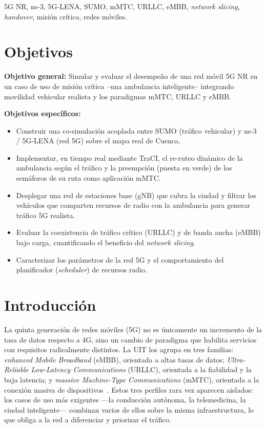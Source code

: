 \documentclass[conference,onecolumn]{IEEEtran}
\begin{document}
\begin{IEEEkeywords}
5G NR, ns-3, 5G-LENA, SUMO, mMTC, URLLC, eMBB, \textit{network slicing},
\textit{handover}, misión crítica, redes móviles.
\end{IEEEkeywords}

\IEEEpeerreviewmaketitle

\section*{Objetivos}
\textbf{Objetivo general:} Simular y evaluar el desempeño de una red móvil 5G NR
en un caso de uso de misión crítica --una ambulancia inteligente-- integrando
movilidad vehicular realista y los paradigmas mMTC, URLLC y eMBB.

\noindent\textbf{Objetivos específicos:}
\begin{itemize}
\item Construir una co-simulación acoplada entre SUMO (tráfico vehicular) y ns-3
/ 5G-LENA (red 5G) sobre el mapa real de Cuenca.
\item Implementar, en tiempo real mediante TraCI, el re-ruteo dinámico de la
ambulancia según el tráfico y la preempción (puesta en verde) de los semáforos
de su ruta como aplicación mMTC.
\item Desplegar una red de estaciones base (gNB) que cubra la ciudad y filtrar
los vehículos que comparten recursos de radio con la ambulancia para generar
tráfico 5G realista.
\item Evaluar la coexistencia de tráfico crítico (URLLC) y de banda ancha (eMBB)
bajo carga, cuantificando el beneficio del \textit{network slicing}.
\item Caracterizar los parámetros de la red 5G y el comportamiento del
planificador (\textit{scheduler}) de recursos radio.
\end{itemize}

\section{Introducción}
La quinta generación de redes móviles (5G) no es únicamente un incremento de la
tasa de datos respecto a 4G, sino un cambio de paradigma que habilita servicios
con requisitos radicalmente distintos. La UIT los agrupa en tres familias:
\textit{enhanced Mobile Broadband} (eMBB), orientada a altas tasas de datos;
\textit{Ultra-Reliable Low-Latency Communications} (URLLC), orientada a la
fiabilidad y la baja latencia; y \textit{massive Machine-Type Communications}
(mMTC), orientada a la conexión masiva de dispositivos~\cite{itu2083}. Estos
tres perfiles rara vez aparecen aislados: los casos de uso más exigentes ---la
conducción autónoma, la telemedicina, la ciudad inteligente--- combinan varios
de ellos sobre la misma infraestructura, lo que obliga a la red a diferenciar y
priorizar el tráfico.
\end{document}
